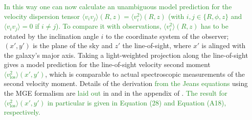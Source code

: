 \documentclass[useAMS,usenatbib]{mnras}
\newcommand*\diff{\mathop{}\!\mathrm{d}}
\newcommand{\NEW}[1]{\textcolor{ForestGreen}{#1}}
\newcommand{\OLD}[1]{}
\begin{document}
\NEW{In this way one can now calculate an unambiguous model prediction for the velocity dispersion tensor $\langle v_i v_j \rangle(R,z) = \langle v_i^2 \rangle(R,z)$ (with $i,j \in \{ R,\phi, z\}$ and $\langle v_i v_j \rangle=0$ if $i\neq j$). To compare it with observations, $\langle v_i^2 \rangle(R,z)$ has to be}\OLD{$\langle v_i^2 \rangle$ is then} rotated by the inclination angle $i$ to the coordinate system of the observer; $(x',y')$ is the plane of the sky and $z'$ the line-of-sight, where $x'$ is alinged with the galaxy's major axis. Taking a light-weighted projection along the line-of-sight gives a model prediction for the line-of-sight velocity second moment \NEW{$\langle v_\text{los}^2\rangle(x',y')$}, which is comparable to actual spectroscopic measurements of the second velocity moment. Details of the derivation \NEW{from the Jeans equations} using the MGE formalism are \OLD{given}\NEW{laid out} in \citet{Cap08} and in the appendix of \citet{GlennEC}. \OLD{We therefore just give the result for the line-of-sight second velocity moment prediction from the Jeans equations,}\NEW{The result for $\langle v_\text{los}^2\rangle(x',y')$ in particular is given in Equation (28) and Equation (A18), respectively.}
\OLD{\begin{eqnarray}
&&\left(I \langle v_\text{los}^2\rangle\right)(x',y')\nonumber\\
&&= 4 \pi^{3/2} G \int_0^1 \sum_{i=1}^N \sum_{k=1}^M \nu_{0,i} \ q_k \ \rho_{0,k} \ u^2\nonumber\\
&& \times \frac{\sigma_i^2 \ q^{2}_i \left( \cos^2 i + \frac{\sin^2 i}{1-\beta_{z,i}}\right) + \mathscr{D} \  {x'}^{2} \sin^2 i}{(1-\mathscr{C}u^2) \sqrt{(\mathscr{A} + \mathscr{B} \cos^2 i) \left[1-(1-q^{2}_k) u^2 \right]}}\nonumber\\
&& \times \exp\left\{- \mathscr{A} \left[{x'}^{2} + \frac{(\mathscr{A}+\mathscr{B}) \ {y'}^{2}}{\mathscr{A}+\mathscr{B}\cos^2 i}\right] \right\} \diff u, \label{eq:explicitLOSvelCap}
\end{eqnarray}
with $N$ Gaussians describing the tracer distribution $\nu(R,z)$ and $M$ Gaussians describing the mass distribution $\rho(R,z)$, $\rho_{0,k}$ being the $k$-th mass density Gaussian evaluated at $(R=0,z=0)$ and
\begin{eqnarray*}
\mathscr{A} &=& \frac 12 \left(\frac{u^2}{\sigma_k^2} + \frac{1}{\sigma_i^2} \right)\nonumber\\
\mathscr{B} &=& \frac 12 \left\{\frac{1-q^{2}_i}{\sigma_i^2 q^{2}_i} + \frac{(1-q^{2}_k)u^4}{\sigma_k^2 \left[1-(1-{q}_k^{2})u^2 \right]} \right\}\nonumber\\
\mathscr{C} &=& 1- q^{2}_k - \frac{\sigma_i^2 q^{2}_i}{\sigma^2_k}\nonumber\\
\mathscr{D} &=& 1 - \frac{q^{2}_i}{1-\beta_{z,i}} - \left[ \left(1-\frac{1}{1-\beta_{i,z}}\right)\mathscr{C} + \frac{1-q^{2}_k}{1-\beta_{z,i}}\right] u^2.\nonumber
\end{eqnarray*}}
\end{document}
